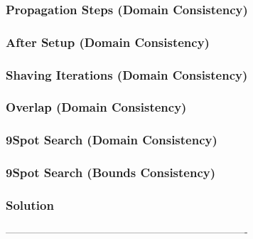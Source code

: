 \begin{frame}
\frametitle{Propagation Steps (Domain Consistency)}
\vfill
{}
\end{frame}

\begin{frame}
\frametitle{After Setup (Domain Consistency)}

\end{frame}

\begin{frame}
\frametitle{Shaving Iterations (Domain Consistency)}
\vfill
{}
\end{frame}

\begin{frame}
\frametitle{Overlap (Domain Consistency)}

\end{frame}



\begin{frame}[label=spotgac]
\frametitle{9Spot Search (Domain Consistency)}
\vfill
{}
\end{frame}

\begin{frame}[label=spotbc]
\frametitle{9Spot Search (Bounds Consistency)}
\end{frame}


\begin{frame}
\frametitle{Solution}

\end{frame}

-------------------------------------------------------------------------
